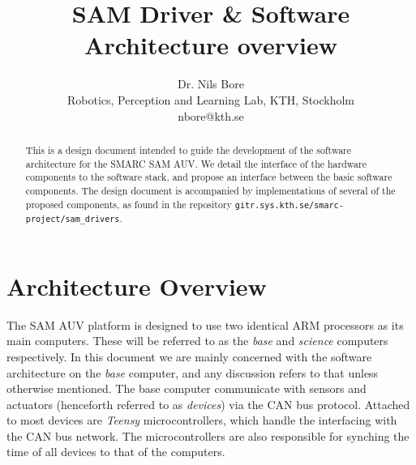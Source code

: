 \documentclass[9pt,technote]{IEEEtran} %
\begin{document}

\title{SAM Driver \& Software Architecture overview}%
\author{Dr. Nils Bore\\ %
Robotics, Perception and Learning Lab, KTH, Stockholm\\
nbore@kth.se} %

\maketitle

\begin{abstract}
This is a design document intended to guide the development
of the software architecture for the SMARC SAM AUV.
We detail the interface of the hardware components to the
software stack, and propose an interface between
the basic software components. The design document
is accompanied by implementations of several of the
proposed components, as found in the repository
\texttt{gitr.sys.kth.se/smarc-project/sam\_drivers}.
\end{abstract}


\section{Architecture Overview}
\label{overview}

The SAM AUV platform is designed to use two identical ARM processors as its main computers.
These will be referred to as the \textit{base} and \textit{science} computers respectively.
In this document we are mainly concerned with the software architecture on the \textit{base}
computer, and any discussion refers to that unless otherwise mentioned.
The base computer communicate with sensors and actuators (henceforth referred to as \textit{devices})
via the CAN bus protocol. Attached to most devices are \textit{Teensy} microcontrollers, which
handle the interfacing with the CAN bus network. The microcontrollers are also responsible for
synching the time of all devices to that of the computers.
\end{document}
